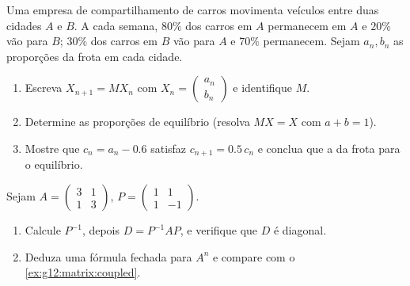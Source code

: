 \begin{exercise}[$\star\star$]\label{exo:g12:matrix:7}
Uma empresa de compartilhamento de carros movimenta veículos entre duas
cidades $A$ e $B$. A cada semana, $80\%$ dos carros em $A$ permanecem em
$A$ e $20\%$ vão para $B$; $30\%$ dos carros em $B$ vão para $A$ e $70\%$
permanecem. Sejam $a_n, b_n$ as proporções da frota em cada cidade.
\begin{omfigure}
\end{omfigure}
\begin{enumerate}
  \item Escreva $X_{n+1} = MX_n$ com
        $X_n = \begin{pmatrix} a_n\\ b_n\end{pmatrix}$ e identifique $M$.
  \item Determine as proporções de equilíbrio (resolva $MX = X$ com
        $a + b = 1$).
  \item Mostre que $c_n = a_n - 0.6$ satisfaz $c_{n+1} = 0.5\,c_n$ e
        conclua que a  da frota  para o equilíbrio.
\end{enumerate}
\end{exercise}

\begin{exercise}[$\star\star\star$]\label{exo:g12:matrix:8}
Sejam $A = \begin{pmatrix} 3 & 1\\ 1 & 3 \end{pmatrix}$,
$P = \begin{pmatrix} 1 & 1\\ 1 & -1 \end{pmatrix}$.
\begin{enumerate}
  \item Calcule $P^{-1}$, depois $D = P^{-1}AP$, e verifique que $D$ é
        diagonal.
  \item Deduza uma fórmula fechada para $A^n$ e compare com o
        \cref{ex:g12:matrix:coupled}.
\end{enumerate}
\end{exercise}

